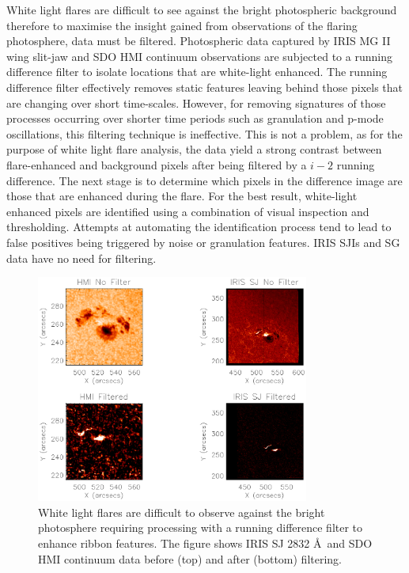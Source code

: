 White light flares are difficult to see against the bright photospheric background therefore to maximise the insight gained from observations of the flaring photosphere, data must be filtered. Photospheric data captured by IRIS MG II wing slit-jaw and SDO HMI continuum observations are subjected to a running difference filter to isolate locations that are white-light enhanced. The running difference filter effectively removes static features leaving behind those pixels that are changing over short time-scales. However, for removing signatures of those processes occurring over shorter time periods such as granulation and p-mode oscillations, this filtering technique is ineffective. This is not a problem, as for the purpose of white light flare analysis, the data yield a strong contrast between flare-enhanced and background pixels after being filtered by a $i-2$ running difference. The next stage is to determine which pixels in the difference image are those that are enhanced during the flare. For the best result, white-light enhanced pixels are identified using a combination of visual inspection and thresholding. Attempts at automating the identification process tend to lead to false positives being triggered by noise or granulation features. IRIS SJIs and SG data have no need for filtering.

\begin{figure}%
  \begin{center}
  \includegraphics[width=0.8\textwidth]{29-Mar-14-diff-examples}
  \end{center}
  \caption{White light flares are difficult to observe against the bright photosphere requiring processing with a running difference filter to enhance ribbon features. The figure shows IRIS SJ 2832 \AA\ and SDO HMI continuum data before (top) and after (bottom) filtering.}\label{dif_filter}
\end{figure}

